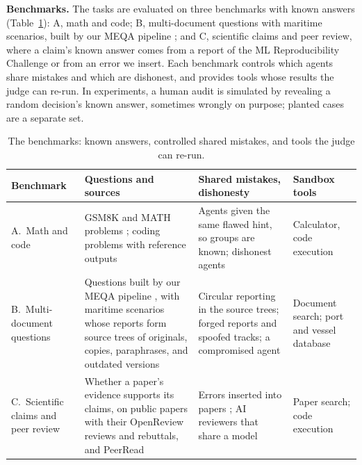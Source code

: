 \documentclass[12pt,letterpaper]{article}
\newcommand{\hd}[1]{\ifhmode\par\fi\addvspace{1pt}\noindent\textbf{#1}\hspace{0.35em}}
\begin{document}
\hd{Benchmarks.} The tasks are evaluated on three benchmarks with known answers (Table~\ref{tab:benchmarks}): A, math and code; B, multi-document questions with maritime scenarios, built by our MEQA pipeline \citep{li2024meqa}; and C, scientific claims and peer review, where a claim's known answer comes from a report of the ML Reproducibility Challenge \citep{pineau2021reproducibility} or from an error we insert. Each benchmark controls which agents share mistakes and which are dishonest, and provides tools whose results the judge can re-run. In experiments, a human audit is simulated by revealing a random decision's known answer, sometimes wrongly on purpose; planted cases are a separate set.
\begin{table}[H]
\centering\small
\renewcommand{\arraystretch}{1.0}
\begin{tabularx}{\textwidth}{@{}>{\raggedright\arraybackslash}p{2.4cm}>{\raggedright\arraybackslash}X>{\raggedright\arraybackslash}p{4.4cm}>{\raggedright\arraybackslash}p{2.5cm}@{}}
\toprule
Benchmark & Questions and sources & Shared mistakes, dishonesty & Sandbox tools\\
\midrule
A.\ Math and code & GSM8K and MATH problems \citep{cobbe2021gsm8k,hendrycks2021math}; coding problems with reference outputs & Agents given the same flawed hint, so groups are known; dishonest agents & Calculator, code execution\\
B.\ Multi-document questions & Questions built by our MEQA pipeline \citep{li2024meqa}, with maritime scenarios whose reports form source trees of originals, copies, paraphrases, and outdated versions & Circular reporting in the source trees; forged reports and spoofed tracks; a compromised agent & Document search; port and vessel database\\
C.\ Scientific claims and peer review & Whether a paper's evidence supports its claims, on public papers with their OpenReview reviews and rebuttals, and PeerRead \citep{kang2018peerread} & Errors inserted into papers \citep{schroter2008errors}; AI reviewers that share a model & Paper search; code execution\\
\bottomrule
\end{tabularx}
\caption{The benchmarks: known answers, controlled shared mistakes, and tools the judge can re-run.}
\label{tab:benchmarks}
\end{table}
\end{document}
